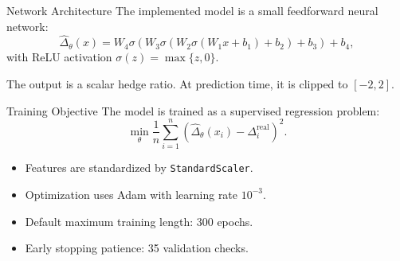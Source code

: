 \documentclass[aspectratio=169,11pt]{beamer}
\begin{document}
\begin{frame}{Network Architecture}
The implemented model is a small feedforward neural network:
\[
\widehat\Delta_\theta(x)
= W_4\sigma\!\left(W_3\sigma\!\left(W_2\sigma\!\left(W_1x+b_1\right)+b_2\right)+b_3\right)+b_4,
\]
with ReLU activation $\sigma(z)=\max\{z,0\}$.

\vspace{0.2cm}
\begin{center}
\end{center}

\vspace{0.1cm}
The output is a scalar hedge ratio. At prediction time, it is clipped to $[-2,2]$.
\end{frame}

\begin{frame}{Training Objective}
The model is trained as a supervised regression problem:
\[
  \min_\theta \frac{1}{n}\sum_{i=1}^n
  \left(\widehat\Delta_\theta(x_i)-\Delta_i^{\mathrm{real}}\right)^2.
\]

\begin{itemize}
  \item Features are standardized by \texttt{StandardScaler}.
  \item Optimization uses Adam with learning rate $10^{-3}$.
  \item Default maximum training length: 300 epochs.
  \item Early stopping patience: 35 validation checks.
\end{itemize}

\end{frame}
\end{document}
